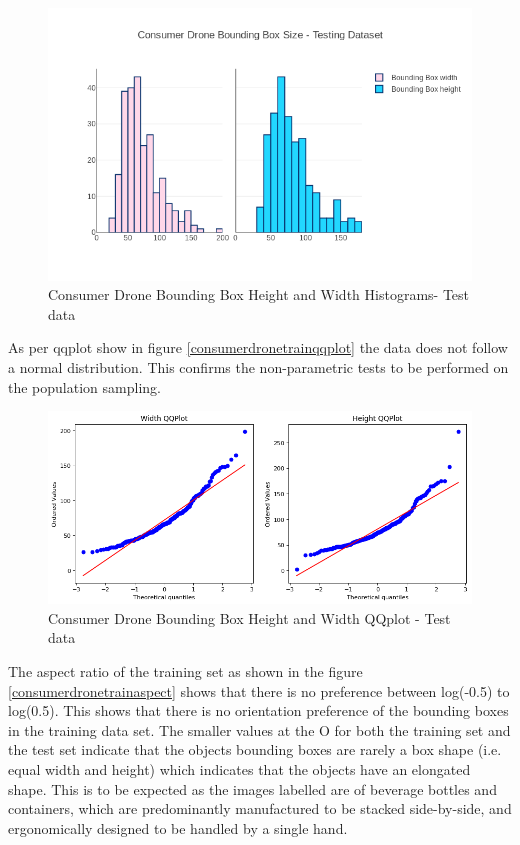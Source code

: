 \documentclass{IEEEtran}
\begin{document}
\begin{figure}[h]
\centering
\label{consumerdronetesthist}
\includegraphics[scale=0.4]{images/test-histogram.png}
\caption{Consumer Drone Bounding Box Height and Width Histograms- Test data}
\end{figure}

As per qqplot show in figure \ref{consumerdronetrainqqplot} the data does not follow a normal distribution. This confirms the non-parametric tests to be performed on the population sampling.

\begin{figure}[h]
\centering
\label{consumerdronetestqqplot}
\includegraphics[scale=0.4]{images/test-qqplot.png}
\caption{Consumer Drone Bounding Box Height and Width QQplot - Test data}
\end{figure}

The aspect ratio of the training set as shown in the figure \ref{consumerdronetrainaspect} shows that there is no preference between log(-0.5) to log(0.5). This shows that there is no orientation preference of the bounding boxes in the training data set. The smaller values at the O for both the training set and the test set indicate that the objects bounding boxes are rarely a box shape (i.e. equal width and height) which indicates that the objects have an elongated shape. This is to be expected as the images labelled are of beverage bottles and containers, which are predominantly manufactured to be stacked side-by-side, and ergonomically designed to be handled by a single hand.
\end{document}
